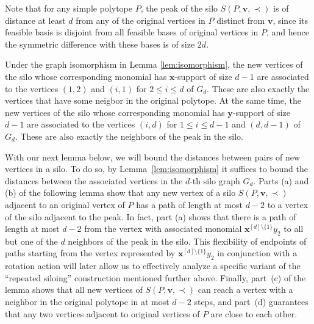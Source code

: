 \documentclass[centering,11pt,reqno]{amsart}
\newtheorem{lem}[theorem]{Lemma}
\theoremstyle{definition}
\begin{document}


Note that for any simple polytope $P$, the peak of the silo $S(P,\mathbf{v},\prec)$ is of distance at least $d$ from any of the original vertices in $P$ distinct from $\mathbf{v}$, since its feasible basis is disjoint from all feasible bases of original vertices in $P$, and hence the symmetric difference with these bases is of size $2d$. 

Under the graph isomorphism in Lemma \ref{lem:isomorphism}, the new vertices of the silo whose corresponding monomial has $\mathbf{x}$-support of size $d-1$ are associated to the vertices $(1,2)$ and $(i,1)$ for $2 \leq i \leq d$ of $G_{d}$. These are also exactly the vertices that have some neigbor in the original polytope. At the same time, the new vertices of the silo whose corresponding monomial has $\mathbf{y}$-support of size $d-1$ are associated to the vertices $(i,d)$ for $1 \leq i \leq d-1$ and $(d,d-1)$ of $G_d$. These are also exactly the neighbors of the peak in the silo.

With our next lemma below, we will bound the distances between pairs of new vertices in a silo. To do so, by Lemma~\ref{lem:isomorphism} it suffices to bound the distances between the associated vertices in the $d$-th silo graph $G_d$. Parts (a) and (b) of the following lemma show that any new vertex of a silo $S(P,\mathbf{v},\prec)$ adjacent to an original vertex of $P$ has a path of length at most $d-2$ to a vertex of the silo adjacent to the peak. In fact, part (a) shows that there is a path of length at most $d-2$ from the vertex with associated monomial $\mathbf{x}^{[d]\setminus \{1\}}y_{2}$ to all but one of the $d$ neighbors of the peak in the silo. This flexibility of endpoints of paths starting from the vertex represented by $\mathbf{x}^{[d] \setminus \{1\}}y_{2}$ in conjunction with a rotation action will later allow us to effectively analyze a specific variant of the ``repeated siloing'' construction mentioned further above. Finally, part~(c) of the lemma shows that all new vertices of $S(P,\mathbf{v},\prec)$ can reach a vertex with a neighbor in the original polytope in at most $d-2$ steps, and part~(d) guarantees that any two vertices adjacent to original vertices of $P$ are close to each other.
\end{document}
